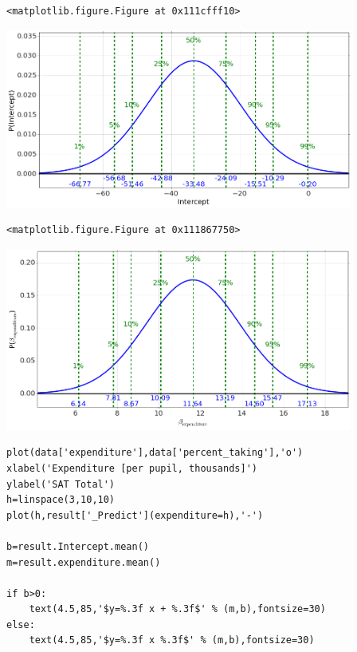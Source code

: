 \begin{verbatim}
<matplotlib.figure.Figure at 0x111cfff10>\end{verbatim}

\begin{center}\includegraphics[width=4.5in]{Regression/Regression_fig7.png}\end{center}

\begin{verbatim}
<matplotlib.figure.Figure at 0x111867750>\end{verbatim}

\begin{center}\includegraphics[width=4.5in]{Regression/Regression_fig8.png}\end{center}

\begin{lstlisting}
plot(data['expenditure'],data['percent_taking'],'o')
xlabel('Expenditure [per pupil, thousands]')
ylabel('SAT Total')
h=linspace(3,10,10)
plot(h,result['_Predict'](expenditure=h),'-')

b=result.Intercept.mean()
m=result.expenditure.mean()

if b>0:
    text(4.5,85,'$y=%.3f x + %.3f$' % (m,b),fontsize=30)
else:
    text(4.5,85,'$y=%.3f x %.3f$' % (m,b),fontsize=30)

\end{lstlisting}

